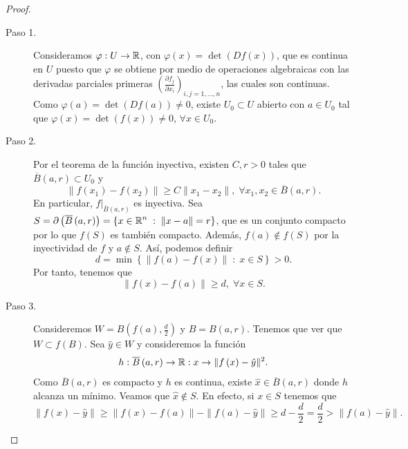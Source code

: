 \begin{proof}
\begin{description}
\item[Paso 1.] Consideramos $\displaystyle \varphi : U \to \mathbb{R} $, con $\displaystyle \varphi\left(x\right) = \det\left(Df\left(x\right)\right) $, que es continua en $\displaystyle U $ puesto que $\displaystyle \varphi $ se obtiene por medio de operaciones algebraicas con las derivadas parciales primeras $\displaystyle \left(\frac{\partial f_{j}}{\partial x_{i}}\right)_{i,j = 1, \ldots, n} $, las cuales son continuas. Como $\displaystyle \varphi\left(a\right) = \det\left(Df\left(a\right)\right) \neq 0 $, existe $\displaystyle U_{0} \subset U $ abierto con $\displaystyle a\in U_{0} $ tal que $\displaystyle \varphi\left(x\right) = \det\left(f\left(x\right)\right) \neq 0 $, $\displaystyle \forall x \in U_{0} $. 
\item[Paso 2.] Por el teorema de la función inyectiva, existen $\displaystyle C,r > 0 $ tales que $\displaystyle \overline{B}\left(a,r\right) \subset U_{0} $ y 
	\[\|f\left(x_{1}\right)-f\left(x_{2}\right)\| \geq C \|x_{1}-x_{2}\|, \; \forall x_{1}, x_{2} \in \overline{B}\left(a,r\right) .\]
	En particular, $\displaystyle f|_{\overline{B}\left(a,r\right)} $ es inyectiva. Sea $\displaystyle S = \partial\left(\overline{B}\left(a,r\right)\right) = \left\{ x \in \mathbb{R}^{n} \; : \; \|x-a\| = r\right\}  $, que es un conjunto compacto por lo que $\displaystyle f\left(S\right) $ es también compacto. Además, $\displaystyle f\left(a\right) \not\in f\left(S\right) $ por la inyectividad de $\displaystyle f $ y $\displaystyle a \not\in S $.
	Así, podemos definir
	\[d = \min \left\{ \|f\left(a\right)-f\left(x\right)\|\; : \; x \in S\right\} > 0 .\]
Por tanto, tenemos que
\[ \|f\left(x\right)-f\left(a\right)\| \geq d, \; \forall x \in S .\]
\item[Paso 3.] Consideremos $\displaystyle W = B\left(f\left(a\right), \frac{d}{2}\right) $ y $\displaystyle B = B\left(a,r\right) $. Tenemos que ver que $\displaystyle W \subset f\left(B\right) $. Sea $\displaystyle \hat{y} \in W $ y consideremos la función
	\[ h : \overline{B}\left(a,r\right) \to \mathbb{R} : x \to \|f\left(x\right)-\hat{y}\|^{2} .\]
Como $\displaystyle \overline{B}\left(a,r\right) $ es compacto y $\displaystyle h $ es continua, existe $\displaystyle \hat{x} \in \overline{B}\left(a,r\right) $ donde $\displaystyle h $ alcanza un mínimo. Veamos que $\displaystyle \hat{x} \not\in S $. En efecto, si $\displaystyle x \in S $ tenemos que 
\[\|f\left(x\right)-\hat{y}\| \geq \|f\left(x\right)-f\left(a\right)\| - \|f\left(a\right)-\hat{y}\| \geq d -\frac{d}{2} = \frac{d}{2} > \|f\left(a\right)-\hat{y}\| .\]

\end{description}
\end{proof}

